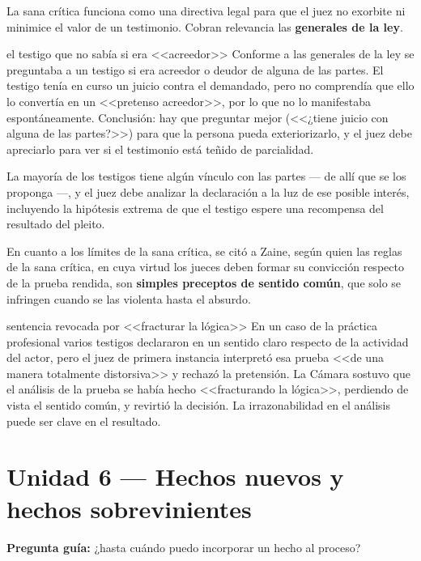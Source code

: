 \documentclass[12pt,oneside]{book}
\begin{document}
La sana crítica funciona como una directiva legal para que el juez no exorbite ni minimice el valor de un testimonio. Cobran relevancia las \textbf{generales de la ley}.

\begin{example}{el testigo que no sabía si era <<acreedor>>}
Conforme a las generales de la ley se preguntaba a un testigo si era acreedor o deudor de alguna de las partes. El testigo tenía en curso un juicio contra el demandado, pero no comprendía que ello lo convertía en un <<pretenso acreedor>>, por lo que no lo manifestaba espontáneamente. Conclusión: hay que preguntar mejor (<<¿tiene juicio con alguna de las partes?>>) para que la persona pueda exteriorizarlo, y el juez debe apreciarlo para ver si el testimonio está teñido de parcialidad.
\end{example}

La mayoría de los testigos tiene algún vínculo con las partes --- de allí que se los proponga ---, y el juez debe analizar la declaración a la luz de ese posible interés, incluyendo la hipótesis extrema de que el testigo espere una recompensa del resultado del pleito.

En cuanto a los límites de la sana crítica, se citó a Zaine, según quien las reglas de la sana crítica, en cuya virtud los jueces deben formar su convicción respecto de la prueba rendida, son \textbf{simples preceptos de sentido común}, que solo se infringen cuando se las violenta hasta el absurdo.

\begin{example}{sentencia revocada por <<fracturar la lógica>>}
En un caso de la práctica profesional varios testigos declararon en un sentido claro respecto de la actividad del actor, pero el juez de primera instancia interpretó esa prueba <<de una manera totalmente distorsiva>> y rechazó la pretensión. La Cámara sostuvo que el análisis de la prueba se había hecho <<fracturando la lógica>>, perdiendo de vista el sentido común, y revirtió la decisión. La irrazonabilidad en el análisis puede ser clave en el resultado.
\end{example}

\section{Unidad 6 --- Hechos nuevos y hechos sobrevinientes}

\textbf{Pregunta guía:} ¿hasta cuándo puedo incorporar un hecho al proceso?
\end{document}
